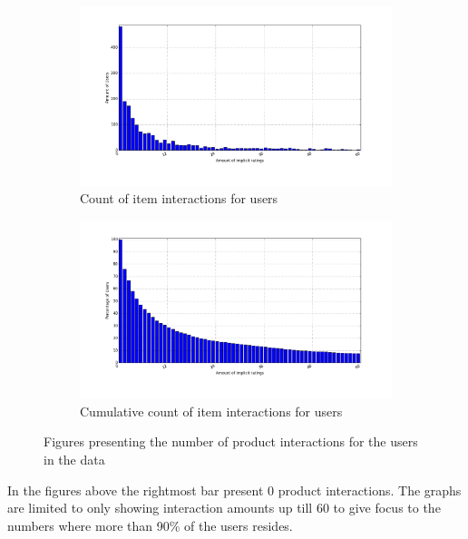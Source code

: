     \begin{figure}[H]
        \centering
        \begin{subfigure}{.5\textwidth}
            \includegraphics[width=\dualGraphWidth]{image/ratingsPerUserdistribution.png}
            \centering
            \caption{Count of item interactions for users}
    \label{figure:ratingsPerUser}
        \end{subfigure}%
        \begin{subfigure}{.5\textwidth}
            \includegraphics[width=\dualGraphWidth]{image/ratingsPerUsercumdistribution.png}
            \centering
            \caption{Cumulative count of item interactions for users}
    \label{figure:ratingsPerUserCum}
        \end{subfigure}
        \caption{Figures presenting the number of product interactions for the users in the data}
    \end{figure}
        In the figures above the rightmost bar present 0 product interactions.
        The graphs are limited to only showing interaction amounts up till 60 to give focus to the numbers where more than 90\% of the users resides.

